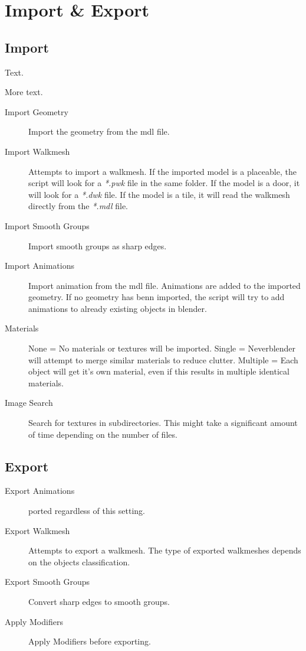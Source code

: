 \section{Import \& Export}

\subsection{Import}

\begin{description}[leftmargin=8em,style=nextline]
  \item[Something] Text.
  \item[Ought else] More text.
\end{description}

\begin{description}
    \item[Import Geometry] Import the geometry from the mdl file.
    \item[Import Walkmesh] Attempts to import a walkmesh. If the imported model is a placeable, the script will look for a {\textit{*.pwk}} file in the same folder. If the model is a door, it will look for a {\textit{*.dwk}} file. If the model is a tile, it will read the walkmesh directly from the {\textit{*.mdl}} file.
    \item[Import Smooth Groups] Import smooth groups as sharp edges.
    \item[Import Animations] Import animation from the mdl file. Animations are added to the imported geometry. If no geometry has benn imported, the script will try to add animations to already existing objects in blender.
    \item[Materials] None = No materials or textures will be imported. Single = Neverblender will attempt to merge similar materials to reduce clutter. Multiple = Each object will get it's own material, even if this results in multiple identical materials.
    \item[Image Search] Search for textures in subdirectories. This might take a significant amount of time depending on the number of files.
\end{description}


\subsection{Export}

\begin{description}
    \item[Export Animations] ported regardless of this setting.
    \item[Export Walkmesh] Attempts to export a walkmesh. The type of exported walkmeshes depends on the objects classification.
    \item[Export Smooth Groups] Convert sharp edges to smooth groups.
    \item[Apply Modifiers] Apply Modifiers before exporting.
\end{description}
